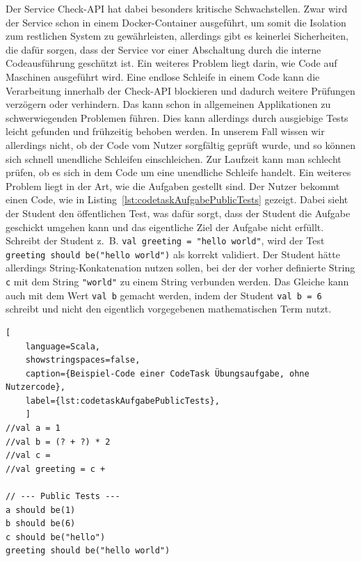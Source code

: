 Der Service Check-API hat dabei besonders kritische Schwachstellen. Zwar wird der Service schon in einem Docker-Container ausgeführt, um somit die Isolation zum restlichen System zu gewährleisten, allerdings gibt es keinerlei Sicherheiten, die dafür sorgen, dass der Service vor einer Abschaltung durch die interne Codeausführung geschützt ist. Ein weiteres Problem liegt darin, wie Code auf Maschinen ausgeführt wird. Eine endlose Schleife in einem Code kann die Verarbeitung innerhalb der Check-API blockieren und dadurch weitere Prüfungen verzögern oder verhindern. Das kann schon in allgemeinen Applikationen zu schwerwiegenden Problemen führen. Dies kann allerdings durch ausgiebige Tests leicht gefunden und frühzeitig behoben werden. In unserem Fall wissen wir allerdings nicht, ob der Code vom Nutzer sorgfältig geprüft wurde, und so können sich schnell unendliche Schleifen einschleichen. Zur Laufzeit kann man schlecht prüfen, ob es sich in dem Code um eine unendliche Schleife handelt. Ein weiteres Problem liegt in der Art, wie die Aufgaben gestellt sind. Der Nutzer bekommt einen Code, wie in Listing~\ref{lst:codetaskAufgabePublicTests} gezeigt. Dabei sieht der Student den öffentlichen Test, was dafür sorgt, dass der Student die Aufgabe geschickt umgehen kann und das eigentliche Ziel der Aufgabe nicht erfüllt. Schreibt der Student z.~B. \texttt{val greeting = "hello world"}, wird der Test \texttt{greeting should be("hello world")} als korrekt validiert. Der Student hätte allerdings String-Konkatenation nutzen sollen, bei der der vorher definierte String \texttt{c} mit dem String \texttt{"\textvisiblespace world"} zu einem String verbunden werden. Das Gleiche kann auch mit dem Wert \texttt{val b} gemacht werden, indem der Student \texttt{val b = 6} schreibt und nicht den eigentlich vorgegebenen mathematischen Term nutzt.
	\begin{lstlisting}[
	language=Scala,
	showstringspaces=false,
	caption={Beispiel-Code einer CodeTask Übungsaufgabe, ohne Nutzercode},
	label={lst:codetaskAufgabePublicTests},
	]
//val a = 1
//val b = (? + ?) * 2
//val c =
//val greeting = c +

// --- Public Tests ---
a should be(1)
b should be(6)
c should be("hello")
greeting should be("hello world")
	\end{lstlisting}

